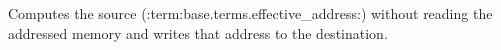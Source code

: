 Computes the source (:term:base.terms.effective_address:) without reading the addressed memory and writes that address to the destination.

